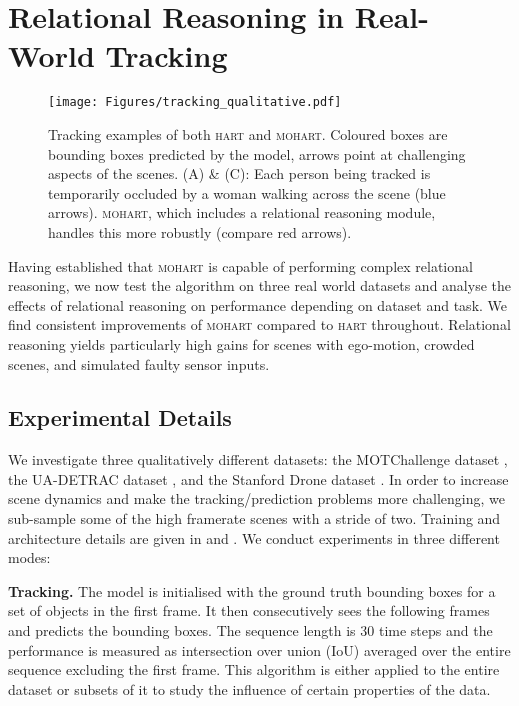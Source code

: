 \section{Relational Reasoning in Real-World Tracking}
\label{sec:experiment_real}

\begin{figure}[ht!]
\centering
\texttt{[image: Figures/tracking\_qualitative.pdf]}
\vspace{-8mm}
\caption{Tracking examples of both \textsc{hart} and \textsc{mohart}. Coloured boxes are bounding boxes predicted by the model, arrows point at challenging aspects of the scenes. (A) \& (C): Each person being tracked is temporarily occluded by a woman walking across the scene (blue arrows). \textsc{mohart}, which includes a relational reasoning module, handles this more robustly (compare red arrows).
\vspace{-4mm}}
\label{fig:tracking_and_predicting}
\end{figure}



Having established that \textsc{mohart} is capable of performing complex relational reasoning, we now test the algorithm on three real world datasets and analyse the effects of relational reasoning on performance depending on dataset and task. We find consistent improvements of \textsc{mohart} compared to \textsc{hart} throughout. Relational reasoning yields particularly high gains for scenes with ego-motion, crowded scenes, and simulated faulty sensor inputs.

\subsection{Experimental Details}
\label{sec:exp_details}

We investigate three qualitatively  different datasets: the MOTChallenge dataset \cite{MOT16}, the UA-DETRAC dataset \cite{Wen15}, and the Stanford Drone dataset \cite{DroneDataset}. In order to increase scene dynamics and make the tracking/prediction problems more challenging, we sub-sample some of the high framerate scenes with a stride of two. Training and architecture details are given in  and .
We conduct experiments in three different modes:


\textbf{Tracking.} The model is initialised with the ground truth bounding boxes for a set of objects in the first frame. It then consecutively sees the following frames and predicts the bounding boxes. The sequence length is 30 time steps and the performance is measured as intersection over union (IoU) averaged over the entire sequence excluding the first frame. This algorithm is either applied to the entire dataset or subsets of it to study the influence of certain properties of the data.

